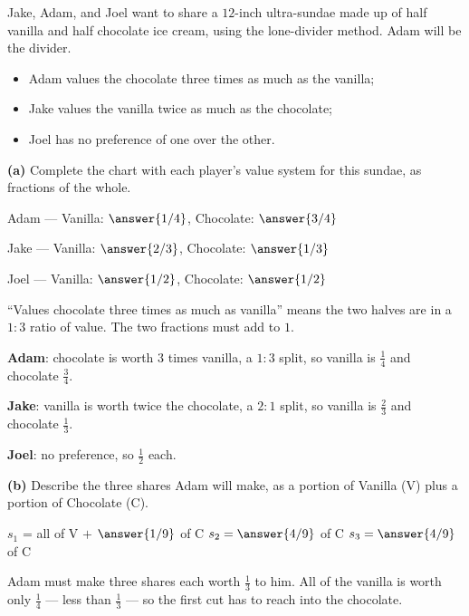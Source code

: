 \documentclass[12pt]{ximera}
\begin{document}
\begin{problem}
Jake, Adam, and Joel want to share a $12$-inch ultra-sundae made up of half vanilla and
half chocolate ice cream, using the lone-divider method. Adam will be the divider.
\begin{itemize}
\item Adam values the chocolate three times as much as the vanilla;
\item Jake values the vanilla twice as much as the chocolate;
\item Joel has no preference of one over the other.
\end{itemize}

\begin{prompt}
\textbf{(a)} Complete the chart with each player's value system for this sundae, as
fractions of the whole.

Adam --- Vanilla: $\answer{1/4}$, \quad Chocolate: $\answer{3/4}$

\smallskip
Jake --- Vanilla: $\answer{2/3}$, \quad Chocolate: $\answer{1/3}$

\smallskip
Joel --- Vanilla: $\answer{1/2}$, \quad Chocolate: $\answer{1/2}$

\begin{hint}
``Values chocolate three times as much as vanilla'' means the two halves are in a
$1:3$ ratio of value. The two fractions must add to $1$.
\end{hint}

\begin{feedback}
\textbf{Adam}: chocolate is worth $3$ times vanilla, a $1:3$ split, so vanilla is
$\frac14$ and chocolate $\frac34$.

\textbf{Jake}: vanilla is worth twice the chocolate, a $2:1$ split, so vanilla is
$\frac23$ and chocolate $\frac13$.

\textbf{Joel}: no preference, so $\frac12$ each.
\end{feedback}
\end{prompt}

\begin{prompt}
\textbf{(b)} Describe the three shares Adam will make, as a portion of Vanilla (V) plus
a portion of Chocolate (C).

$s_1$ = all of V $+$ $\answer{1/9}$ of C \qquad
$s_2 = \answer{4/9}$ of C \qquad
$s_3 = \answer{4/9}$ of C

\begin{hint}
Adam must make three shares each worth $\frac13$ to him. All of the vanilla is worth
only $\frac14$ --- less than $\frac13$ --- so the first cut has to reach into the
chocolate.
\end{hint}


\end{prompt}
\end{problem}
\end{document}
